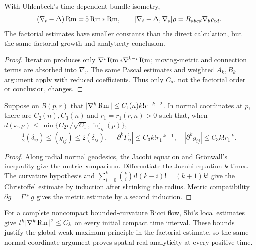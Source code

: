 \begin{example}
\label{ex:chow-ii-uhlenbeck-curvature-commutators}

With Uhlenbeck's time-dependent bundle isometry,
\[
 (\nabla_t-\Delta)\operatorname{Rm}=5\operatorname{Rm}*\operatorname{Rm},
 \qquad [\nabla_t-\Delta,\nabla_a]\rho
 =R_{abcd}\nabla_b\rho_{cd}.
\]
The factorial estimates have smaller constants than the direct calculation,
but the same factorial growth and analyticity conclusion.
\end{example}
\begin{proof}
\sketch
{}
Iteration produces only \(\nabla^i\operatorname{Rm}*\nabla^{k-i}\operatorname{Rm}\); moving-metric and
connection terms are absorbed into \(\nabla_t\).  The same Pascal estimates
and weighted \(A_k,B_k\) argument apply with reduced coefficients.  Thus only
\(C_n\), not the factorial order or conclusion, changes.
\end{proof}

\begin{lemma}
\label{lem:chow-ii-normal-coordinate-metric-derivatives}

Suppose on \(B(p,r)\) that
\(|\nabla^k\operatorname{Rm}|\leq C_1(n)k!r^{-k-2}\).  In normal coordinates at \(p\),
there are \(C_2(n),C_3(n)\) and \(r_1=r_1(r,n)>0\) such that, when
\(d(x,p)\leq\min\{C_2r/\sqrt{C_1},\operatorname{inj}_g(p)\}\),
\[
 \tfrac12(\delta_{ij})\leq(g_{ij})\leq2(\delta_{ij}),\quad
 |\partial^k\Gamma^l_{ij}|\leq C_3k!r_1^{-k-1},\quad
 |\partial^kg_{ij}|\leq C_3k!r_1^{-k}.
\]
\end{lemma}
\begin{proof}
\sketch
Along radial normal geodesics, the Jacobi equation and Grönwall's inequality
give the metric comparison.  Differentiate the Jacobi equation \(k\) times.
The curvature hypothesis and
\(\sum_{i=0}^k\binom{k}{i}i!(k-i)!=(k+1)k!\) give the Christoffel estimate by
induction after shrinking the radius.  Metric compatibility
\(\partial g=\Gamma*g\) gives the metric estimate by a second induction.
\end{proof}

\begin{remark}
\label{rem:chow-ii-noncompact-analyticity}


For a complete noncompact bounded-curvature Ricci flow, Shi's local estimates
give \(t^k|\nabla^k\operatorname{Rm}|^2\leq C_k\) on every initial compact time interval.
These bounds justify the global weak maximum principle in the factorial
estimate, so the same normal-coordinate argument proves spatial real
analyticity at every positive time.
\end{remark}

